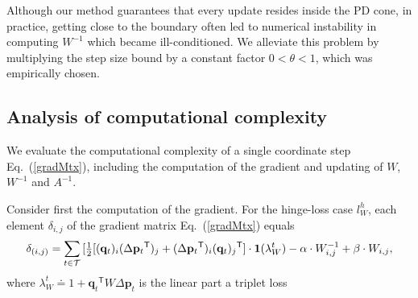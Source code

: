 \documentclass{article} %
\newcommand\mat[1]{{#1}}
\renewcommand\vec[1]{\mathbf{#1}}
\newcommand{\T}{{}^\mathsf{T}}
\newcommand{\W}{\mat{W}}
\newcommand{\eqdef}{\doteq}
\newcommand{\ignore}[1]{}
\newcommand{\q}{{\vec{q}}}
\newcommand{\p}{{\vec{p}}}
\newcommand{\trip}{{t}}
\newcommand{\qt}{{\q_{\trip}}}
\newcommand{\invA}{A^{-1}}
\renewcommand{\eqref}[1]{Eq.~(\ref{#1})}
\begin{document}
\ignore{
Although the step size bound guarantees that every update resides inside the PD cone, in practice, getting close to the boundary often led to numerical instability in computing $\W^{-1}$ which became ill-conditioned. Having the $\log \det$ regularizer in the objective greatly improved the numerical stability.}

Although our method guarantees that every update resides inside the PD cone, in practice, getting close to the boundary often led to numerical instability in computing $\W^{-1}$ which became ill-conditioned. We alleviate this problem by multiplying the step size bound by a constant factor $0< \theta <1$, which was empirically chosen.

\ignore{
\subsection{Numerical Stability}
The step size upper bound keeps the search always inside th e PD cone. This is sufficient for the theoretical optimization process. However, from a practical point of view, since COMET evaluates $\W^{-1}$ on every step, it should not update $\W$ with a solution that is near the PD cone edge, otherwise it will be difficult to evaluate $\W^{-1}$, and will undermine the numerical stability of our approach. 

To guarantee the numerical stability we took two measures: (a) We introduced the $\log \det$ barrier regularization \eqref{eq-logdet-loss}. (b) We multiplied the step size bound by a coefficient $\theta, 0 < \theta < 1$ which was chosen empirically once. 
}

\subsection{Analysis of computational complexity}
We evaluate the computational complexity of a single coordinate step \eqref{gradMtx}, including the computation of the gradient and updating of $\W$, $\W^{-1}$ and $\invA$.

Consider first the computation of the gradient. For the hinge-loss case $l^{h}_W$, each element $\delta_{i,j}$ of the gradient matrix \eqref{gradMtx} equals
\begin{equation}
    \delta_{(i,j)} = \sum\limits_{t\in \cal{T}}{ [\tfrac{1}{2}[(\vec{q}_{t})_i(\Delta\vec{p}_{t}\T)_j + (\Delta\vec{p}_{t}\T)_i(\vec{q}_{t})_j\T] } \cdot \textbf{1}(\lambda_{W}^t) - \alpha \cdot \W^{-1}_{i,j} + \beta \cdot \W_{i,j},
\label{gradMatElem}
\end{equation}
where $\lambda_{W}^t \eqdef 1+\qt\T \W \Delta\p_{t}$ is the linear part a triplet loss
\end{document}
